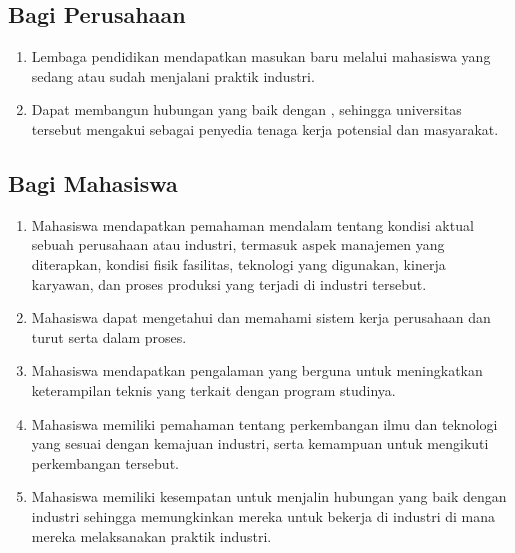 \subsection{Bagi Perusahaan}

\begin{enumerate}
    \item Lembaga pendidikan mendapatkan masukan baru melalui mahasiswa yang sedang atau sudah menjalani praktik industri.
    \item Dapat membangun hubungan yang baik dengan {\fakultas} {\universitas}, sehingga universitas tersebut mengakui {\perusahaan} sebagai penyedia tenaga kerja potensial dan masyarakat.
\end{enumerate}

\subsection{Bagi Mahasiswa}

\begin{enumerate}
    \item Mahasiswa mendapatkan pemahaman mendalam tentang kondisi aktual sebuah perusahaan atau industri, termasuk aspek manajemen yang diterapkan, kondisi fisik fasilitas, teknologi yang digunakan, kinerja karyawan, dan proses produksi yang terjadi di industri tersebut.
    \item Mahasiswa dapat mengetahui dan memahami sistem kerja perusahaan dan turut serta dalam proses.
    \item Mahasiswa mendapatkan pengalaman yang berguna untuk meningkatkan keterampilan teknis yang terkait dengan program studinya.
    \item Mahasiswa memiliki pemahaman tentang perkembangan ilmu dan teknologi yang sesuai dengan kemajuan industri, serta kemampuan untuk mengikuti perkembangan tersebut.
    \item Mahasiswa memiliki kesempatan untuk menjalin hubungan yang baik dengan industri sehingga memungkinkan mereka untuk bekerja di industri di mana mereka melaksanakan praktik industri.
\end{enumerate}

